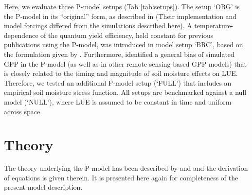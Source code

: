 \documentclass[gmd, manuscript]{copernicus}
\begin{document}
Here, we evaluate three P-model setups (Tab \ref{tab:setups}). The setup `ORG' is the P-model in its ``original'' form, as described in \citet{wang17natpl} (Their implementation and model forcings differed from the simulations described here). A temperature-dependence of the quantum yield efficiency, held constant for previous publications using the P-model, was introduced in model setup `BRC', based on the formulation given by \citet{bernacchi03pce}. Furthermore, \citet{stocker19natgeo} identified a general bias of simulated GPP in the P-model (as well as in other remote sensing-based GPP models) that is closely related to the timing and magnitude of soil moisture effects on LUE. Therefore, we tested an additional P-model setup (`FULL') that includes an empirical soil moisture stress function. All setups are benchmarked against a null model (`NULL'), where LUE is assumed to be constant in time and uniform across space. %


\section{Theory}
\label{sec:theory}

The theory underlying the P-model has been described by \citet{prentice14ecollett} and \citet{wang17natpl} and the derivation of equations is given therein. It is presented here again for completeness of the present model description.
\end{document}
